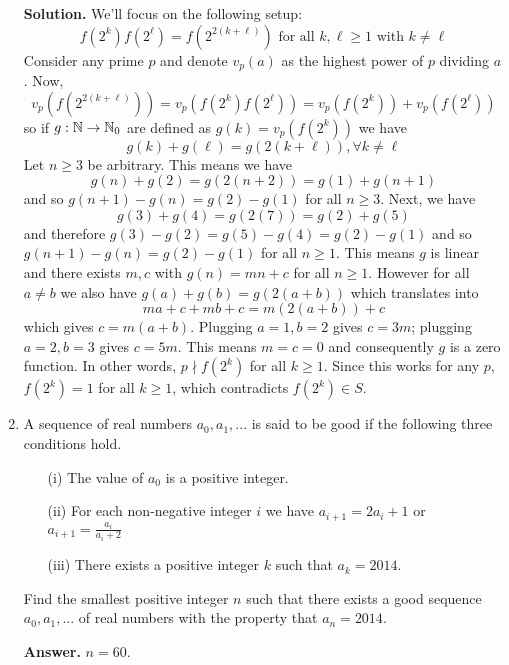 \documentclass[11pt,a4paper]{article}
\begin{document}
\begin{enumerate}
	\textbf{Solution.} We'll focus on the following setup: 
	\[
	f (2^k)f (2^{\ell}) = f (2^{2(k+\ell)})\text{ for all }k, \ell\ge 1\text{ with }k \ne \ell
	\]
	Consider any prime $p$ and denote $v_p(a)$ as the highest power of $p$ dividing $a$. Now, 
	\[
	v_p(f (2^{2(k+\ell)})) = v_p(f (2^k)f (2^{\ell}) ) = v_p(f (2^k)) + v_p(f (2^{\ell}))
	\]
	so if $g: \mathbb{N}\to\mathbb{N}_0$ are defined as $g(k)=v_p(f(2^k))$ we have 
	\[
	g(k)+g(\ell)=g(2(k+\ell)), \forall k\neq \ell
	\]
	Let $n\ge 3$ be arbitrary. This means we have 
	\[
	g(n)+g(2)=g(2(n+2))=g(1)+g(n+1)
	\]
	and so $g(n+1)-g(n)=g(2)-g(1)$ for all $n\ge 3$. Next, we have 
	\[
	g(3)+g(4)=g(2(7))=g(2)+g(5)
	\]
	and therefore $g(3)-g(2)=g(5)-g(4)=g(2)-g(1)$ and so $g(n+1)-g(n)=g(2)-g(1)$ for all $n\ge 1$. This means $g$ is linear and there exists $m, c$ with $g(n)=mn+c$ for all $n\ge 1$. However for all $a\neq b$ we also have $g(a)+g(b)=g(2(a+b))$ which translates into 
	\[
	ma+c+mb+c=m(2(a+b))+c
	\]
	which gives $c=m(a+b)$. Plugging $a=1, b=2$ gives $c=3m$; plugging $a=2, b=3$ gives $c=5m$. This means $m=c=0$ and consequently $g$ is a zero function. In other words, $p\nmid f(2^k)$ for all $k\ge 1$. Since this works for any $p$, $f(2^k)=1$ for all $k\ge 1$, which contradicts $f(2^k)\in S$. 
	
	\item A sequence of real numbers $a_0, a_1, . . .$ is said to be good if the following three conditions hold.
	\begin{itemize}
		\item[(i)] The value of $a_0$ is a positive integer.
		\item[(ii)] For each non-negative integer $i$ we have $a_{i+1} = 2a_i + 1 $ or $a_{i+1} =\frac{a_i}{a_i + 2} $
		\item[(iii)] There exists a positive integer $k$ such that $a_k = 2014$.
	\end{itemize}
	
	Find the smallest positive integer $n$ such that there exists a good sequence $a_0, a_1, . . .$ of real numbers with the property that $a_n = 2014$.
	
	\textbf{Answer.} $n=60$. 
	

\end{enumerate}
\end{document}
